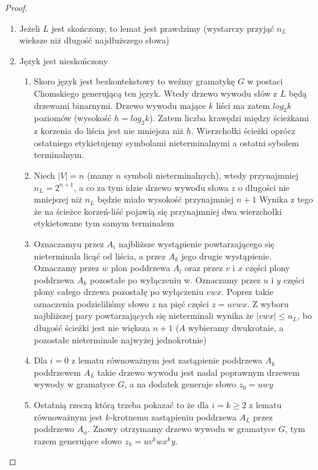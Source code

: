 \begin{lemat}
		\begin{proof}~\\
			\begin{enumerate}
				\item Jeżeli $L$ jest skończony, to lemat jest prawdzimy (wystarczy przyjąć $n_L$ wieksze niż długość najdłuższego słowa)
				\item Język jest nieskończony
					\begin{enumerate}
						\item Skoro język jest bezkontekstowy to weźmy gramatykę $G$ w postaci Chomskiego generującą ten język. Wtedy 
						drzewo wywodu słów z $L$ będą drzewami binarnymi. Drzewo wywodu mające $k$ liści ma zatem $log_2k$ poziomów
						(wysokość $h = log_2k$). Zatem liczba krawędzi między ścieżkami z korzenia do liścia jest nie mniejsza niż $h$.
						Wierzchołki ścieżki oprócz ostatniego etykietujemy symbolami nieterminalnymi a ostatni sybolem terminalnym.
						\item Niech $|V| = n$ (mamy $n$ symboli nieterminalnych), wtedy przynajmniej $n_L = 2^{n+1}$, a co za tym 
						idzie drzewo wywodu słowa $z$ o długości nie mniejszej niż $n_L$ będzie miało wysokość przynajmniej $n+1$
						Wynika z tego że na ścieżce korzeń-liść pojawią się przynajmniej dwa wierzchołki etykietowane tym samym terminalem
						\item Oznaczamyu przez $A_i$ najbliższe wystąpienie powtarzającego się nieterminala licąć od liścia, a przez $A_k$
						jego drugie wystąpienie. Oznaczamy przez $w$ plon poddrzewa $A_l$ oraz przez $v$ i $x$ części plony poddrzewa $A_k$
						pozostałe po wyłączeniu w. Oznaczamy przez $u$ i $y$ części plony całego drzewa pozostałę po wyłączeniu $vwx$. 
						Poprez takie oznaczenia podzieliliśmy słowo $z$ na pięć części $z = uvwx$. Z wyboru najbliższej pary
						powtarzających się nieterminali wynika że $|vwx| \leqslant n_L$, bo długość ścieżki jest nie większa $n+1$
						($A$ wybieramy dwukrotnie, a pozostałe nieterminale najwyżej jednokrotnie)
						\item Dla $i=0$ z lematu równoważnym jest zastąpienie poddrzewa $A_k$ poddrzewem $A_L$ takie drzewo wywodu jest 
						nadal poprawnym drzewem wywody w gramatyce $G$, a na dodatek generuje słowo $z_0 = uwy$
						\item Ostatnią rzeczą którą trzeba pokazać to że dla $i = k \geqslant 2$  z lematu równoważnym jest $k$-krotnemu
						zastąpieniu poddrzewa $A_L$ przez poddrzewo $A_\alpha$. Znowy otrzymamy drzewo wywodu w gramatyce $G$, tym
						razem generujące słowo $z_k = uv^kwx^ky$.
					\end{enumerate}					 
			\end{enumerate}
		\end{proof}				
	\end{lemat}
			
